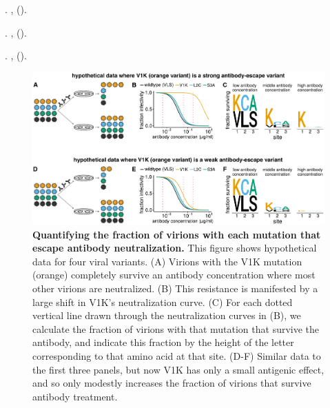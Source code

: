 \documentclass[11pt]{article}
\begin{document}
\begin{thebibliography}{10}
\newblock {}.
\newblock \emph{}
  \textbf{}, 
  ().

\newblock {}.
\newblock \emph{}
  \textbf{}, 
  ().

\newblock {}.
\newblock \emph{}
  \textbf{},  ().

\end{thebibliography}

\clearpage

\begin{figure}
\centerline{\includegraphics[width=\textwidth]{Fig1.pdf}}
\caption{\label{fig:fracsurvive_example}
{\bf Quantifying the fraction of virions with each mutation that escape antibody neutralization.}
This figure shows hypothetical data for four viral variants.
(A) Virions with the V1K mutation (orange) completely survive an antibody concentration where most other virions are neutralized.
(B) This resistance is manifested by a large shift in V1K's neutralization curve.
(C) For each dotted vertical line drawn through the neutralization curves in (B), we calculate the fraction of virions with that mutation that survive the antibody, and indicate this fraction by the height of the letter corresponding to that amino acid at that site.
(D-F) Similar data to the first three panels, but now V1K has only a small antigenic effect, and so only modestly increases the fraction of virions that survive antibody treatment.
}
\end{figure}
\end{document}
